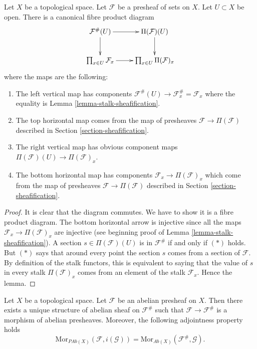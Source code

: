 \begin{lemma}
\label{lemma-diagram-fibre-product}
Let $X$ be a topological space. Let $\mathcal{F}$ be
a presheaf of sets on $X$. Let $U \subset X$ be open.
There is a canonical fibre product diagram
$$
\xymatrix{
\mathcal{F}^\#(U) \ar[d] \ar[r] &
\Pi(\mathcal{F})(U) \ar[d] \\
\prod_{x \in U} \mathcal{F}_x
\ar[r] &
\prod_{x \in U} \Pi(\mathcal{F})_x
}
$$
where the maps are the following:
\begin{enumerate}
\item The left vertical map has components
$\mathcal{F}^\#(U) \to \mathcal{F}^\#_x = \mathcal{F}_x$
where the equality is Lemma \ref{lemma-stalk-sheafification}.
\item The top horizontal map comes from the
map of presheaves $\mathcal{F} \to \Pi(\mathcal{F})$ described
in Section \ref{section-sheafification}.
\item The right vertical map has obvious component
maps $\Pi(\mathcal{F})(U) \to \Pi(\mathcal{F})_x$.
\item The bottom horizontal map has components
$\mathcal{F}_x \to \Pi(\mathcal{F})_x$
which come from the map of presheaves
$\mathcal{F} \to \Pi(\mathcal{F})$ described
in Section \ref{section-sheafification}.
\end{enumerate}
\end{lemma}

\begin{proof}
It is clear that the diagram commutes. We have to show
it is a fibre product diagram. The bottom horizontal arrow
is injective since all the maps $\mathcal{F}_x \to \Pi(\mathcal{F})_x$
are injective (see beginning proof of
Lemma \ref{lemma-stalk-sheafification}).
A section $s \in \Pi(\mathcal{F})(U)$ is in $\mathcal{F}^\#$ if and
only if $(*)$ holds. But $(*)$ says that around every point
the section $s$ comes from a section of $\mathcal{F}$. By definition
of the stalk functors, this is equivalent to saying that
the value of $s$ in every stalk $\Pi(\mathcal{F})_x$ comes
from an element of the stalk $\mathcal{F}_x$. Hence the lemma.
\end{proof}


\begin{lemma}
\label{lemma-sheafify-abelian-presheaf}
Let $X$ be a topological space.
Let $\mathcal{F}$ be an abelian presheaf on $X$.
Then there exists a unique structure of
abelian sheaf on $\mathcal{F}^\#$ such that
$\mathcal{F} \to \mathcal{F}^\#$ is a morphism
of abelian presheaves. Moreover, the following adjointness
property holds
$$
\text{Mor}_{\textit{PAb}(X)}(\mathcal{F}, i(\mathcal{G}))
=
\text{Mor}_{\textit{Ab}(X)}(\mathcal{F}^\#, \mathcal{G}).
$$
\end{lemma}

